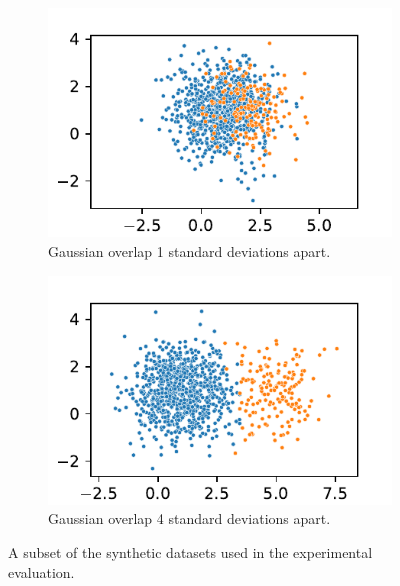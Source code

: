 \begin{figure}{}
\begin{subfigure}[b]{0.24\textwidth}
        \includegraphics[width=\textwidth]{../plots/synthetic_dataset_visualizations/gaussian_overlap_0.83_0.17_1000_1_1.csv.pdf}
        \caption[Network2]%
        {{\small Gaussian overlap 1 standard deviations apart.}}    
        \label{fig:synthetic_dataset_gaussian_1}
    \end{subfigure}
    \hfill
    \begin{subfigure}[b]{0.24\textwidth}  
        \centering 
        \includegraphics[width=\textwidth]{../plots/synthetic_dataset_visualizations/gaussian_overlap_0.83_0.17_1000_1_4.csv.pdf}
        \caption[]%
        {{\small Gaussian overlap 4 standard deviations apart.}}    
        \label{fig:synthetic_dataset_gaussian_4}
    \end{subfigure}
    \caption[]{\label{fig:synthetic-datasets-one} A subset of the synthetic datasets used in the experimental evaluation.}
\end{figure}
